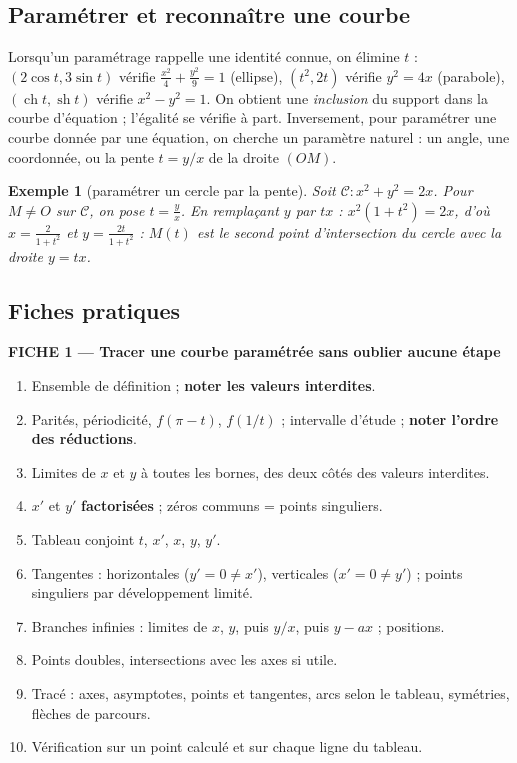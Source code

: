 \documentclass[a4paper,11pt]{article}
\numberwithin{equation}{section}
\numberwithin{figure}{section}
\numberwithin{table}{section}
\theoremstyle{enonce}
\theoremstyle{exemple}
\newtheorem{exemple}[definition]{Exemple}
\theoremstyle{remarque}
\newcommand{\sh}{\operatorname{sh}}
\newcommand{\ch}{\operatorname{ch}}
\begin{document}
\subsection{Paramétrer et reconnaître une courbe}

Lorsqu'un paramétrage rappelle une identité connue, on élimine $t$ : $(2\cos t,3\sin t)$ vérifie
$\frac{x^2}4+\frac{y^2}9=1$ (ellipse), $(t^2,2t)$ vérifie $y^2=4x$ (parabole), $(\ch t,\sh t)$ vérifie $x^2-y^2=1$. On
obtient une \emph{inclusion} du support dans la courbe d'équation ; l'égalité se vérifie à part. Inversement, pour
paramétrer une courbe donnée par une équation, on cherche un paramètre naturel : un angle, une coordonnée, ou la pente
$t=y/x$ de la droite $(OM)$.

\begin{exemple}[paramétrer un cercle par la pente]\label{ex:cercle-pente}
Soit $\mathcal C:x^2+y^2=2x$. Pour $M\neq O$ sur $\mathcal C$, on pose $t=\frac yx$. En remplaçant $y$ par $tx$ :
$x^2(1+t^2)=2x$, d'où $x=\frac2{1+t^2}$ et $y=\frac{2t}{1+t^2}$ : $M(t)$ est le second point d'intersection du cercle avec
la droite $y=tx$.
\end{exemple}

\subsection{Fiches pratiques}

\begin{tcolorbox}[enhanced,breakable,colback=Fond,colframe=Fond,arc=0pt,boxrule=0pt,left=12pt,right=12pt,top=10pt,bottom=10pt,
  borderline north={1.4pt}{0pt}{Bleu}]
\label{fiche:1}{\sffamily\bfseries\color{Bleu}FICHE 1 --- Tracer une courbe paramétrée sans oublier aucune étape}\par\medskip
\begin{enumerate}
\item Ensemble de définition ; \textbf{noter les valeurs interdites}.
\item Parités, périodicité, $f(\pi-t)$, $f(1/t)$ ; intervalle d'étude ; \textbf{noter l'ordre des réductions}.
\item Limites de $x$ et $y$ à toutes les bornes, des deux côtés des valeurs interdites.
\item $x'$ et $y'$ \textbf{factorisées} ; zéros communs = points singuliers.
\item Tableau conjoint $t$, $x'$, $x$, $y$, $y'$.
\item Tangentes : horizontales ($y'=0\neq x'$), verticales ($x'=0\neq y'$) ; points singuliers par développement limité.
\item Branches infinies : limites de $x$, $y$, puis $y/x$, puis $y-ax$ ; positions.
\item Points doubles, intersections avec les axes si utile.
\item Tracé : axes, asymptotes, points et tangentes, arcs selon le tableau, symétries, flèches de parcours.
\item Vérification sur un point calculé et sur chaque ligne du tableau.
\end{enumerate}
\end{tcolorbox}
\end{document}
